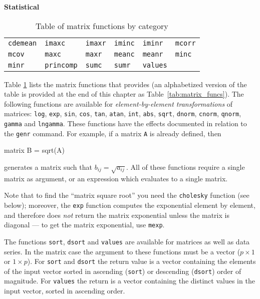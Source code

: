\begin{table}[htbp]
\textbf{Statistical}
\hrulefill

\begin{tabular}{p{}p{}p{}p{}p{}p{}}
\texttt{cdemean}   &
\texttt{imaxc}     &
\texttt{imaxr}     &
\texttt{iminc}     &
\texttt{iminr}     &
\texttt{mcorr}     \\
\texttt{mcov}      &
\texttt{maxc}      &   
\texttt{maxr}      &
\texttt{meanc}     &
\texttt{meanr}     &
\texttt{minc}      \\   
\texttt{minr}      &
\texttt{princomp}  &
\texttt{sumc}      &
\texttt{sumr}      &
\texttt{values}    &
\end{tabular}      
\caption{Table of matrix functions by category}
\label{tab:matrix_funcs_cat}
\end{table}

Table \ref{tab:matrix_funcs_cat} lists the matrix functions that
 provides (an alphabetized version of the table is
provided at the end of this chapter as Table~\ref{tab:matrix_funcs}).
The following functions are available for \textit{element-by-element
  transformations} of matrices: \texttt{log}, \texttt{exp},
\texttt{sin}, \texttt{cos}, \texttt{tan}, \texttt{atan}, \texttt{int},
\texttt{abs}, \texttt{sqrt}, \texttt{dnorm}, \texttt{cnorm},
\texttt{qnorm}, \texttt{gamma} and \texttt{lngamma}.  These functions
have the effects documented in relation to the \texttt{genr} command.
For example, if a matrix \texttt{A} is already defined, then
%
\begin{code}
matrix B = sqrt(A)
\end{code}
%
generates a matrix such that $b_{ij} = \sqrt{a_{ij}}$.  All of these
functions require a single matrix as argument, or an expression which
evaluates to a single matrix.

Note that to find the ``matrix square root'' you need the
\texttt{cholesky} function (see below); moreover, the \texttt{exp}
function computes the exponential element by element, and therefore
does \emph{not} return the matrix exponential unless the matrix is
diagonal --- to get the matrix exponential, use \texttt{mexp}.
  
The functions \texttt{sort}, \texttt{dsort} and \texttt{values}
are available for matrices as well as data series.  In the matrix case
the argument to these functions must be a vector ($p \times 1$ or
$1\times p$).  For \texttt{sort} and \texttt{dsort} the return value
is a vector containing the elements of the input vector sorted in
ascending (\texttt{sort}) or descending (\texttt{dsort}) order of
magnitude.  For \texttt{values} the return is a vector containing the
distinct values in the input vector, sorted in ascending order.

